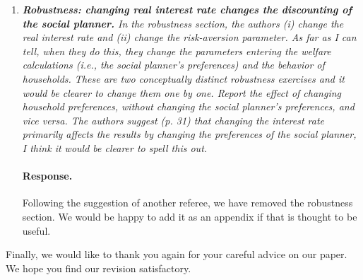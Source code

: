 \documentclass[12pt,letterpaper,english]{article}
\begin{document}
\begin{enumerate}
	\item \textit{\textbf{Robustness: changing real interest rate changes the discounting of the social planner.} In the robustness section, the authors (i) change the real interest rate and (ii) change the risk-aversion parameter. As far as I can tell, when they do this, they change the parameters entering the welfare calculations (i.e., the social planner’s preferences) and the behavior of households. These are two conceptually distinct robustness exercises and it would be clearer to change them one by one. Report the effect of changing household preferences, without changing the social planner’s preferences, and vice versa. The authors suggest (p. 31) that		changing the interest rate primarily affects the results by changing the preferences of the social planner, I think it would be clearer to spell	this out.}
	
	\paragraph{Response.} Following the suggestion of another referee, we have removed the robustness section. We would be happy to add it as an appendix if that is thought to be useful.

\end{enumerate}
	
	
	\bigskip
	
	\noindent Finally, we would like to thank you again for your careful advice on our paper. We hope you find our revision satisfactory.
	
	
	
\end{document}
